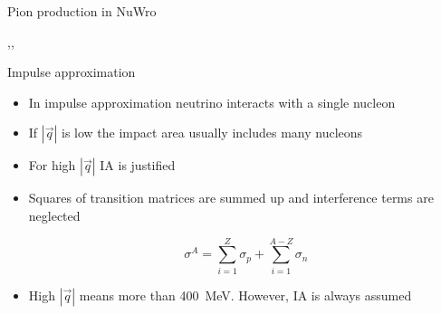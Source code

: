 
\begin{slide}[toc=$\pi$ production]{Pion production in NuWro}
\null\vfill

  \centering

  \sep\sep
  

\vfill\null
\end{slide}


\begin{slide}{Impulse approximation}
\null\vfill

  \twocolumn
  {
    \begin{itemize}
      \item In impulse approximation neutrino interacts with a single nucleon
      \item If $|\vec q|$ is low the impact area usually includes many nucleons
      \item For high $|\vec q|$ IA is justified
    \end{itemize}    
  }
  {
    \centering\scalebox{0.5}{}
  }
  
  \begin{itemize}
    \item Squares of transition matrices are summed up and interference terms are neglected
  
    $$\sigma^A = \sum\limits_{i = 1}^Z \sigma_p + \sum\limits_{i = 1}^{A - Z}\sigma_n$$
    
    \item High $|\vec q|$ means more than 400~MeV. However, IA is always assumed
  \end{itemize}
  
\vfill\null
\end{slide}


